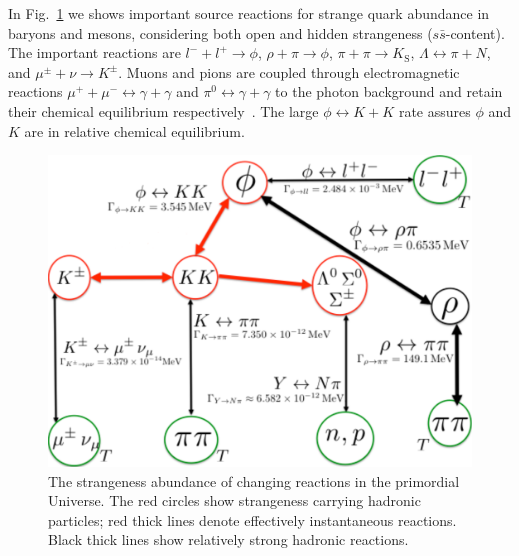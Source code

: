 \documentclass[universe,article,submit,moreauthors,pdftex,a4paper]{Definitions/mdpi}
\begin{document}
In Fig.~\ref{Strangeness_map2} we shows important source reactions for  strange quark abundance in baryons and mesons, considering both open and hidden strangeness ($s\bar s$-content). The important reactions are $l^-+l^+\rightarrow\phi$, $\rho+\pi\rightarrow\phi$, $\pi+\pi\rightarrow K_\mathrm{S}$, $\Lambda \leftrightarrow \pi+ N$, and $\mu^\pm+\nu\rightarrow K^\pm$. Muons and pions are coupled through electromagnetic reactions $\mu^++\mu^-\leftrightarrow\gamma+\gamma$ and $\pi^0\leftrightarrow\gamma+\gamma$ to the photon background and retain their chemical equilibrium respectively~\cite{Rafelski:2021aey,Kuznetsova:2008jt}. The large $\phi\leftrightarrow K+K$ rate assures $\phi$ and $K$ are in relative chemical equilibrium. 
\begin{figure} %
\centering
\includegraphics[width=0.8\linewidth]{./plots/Strangeness002_new.pdf}
\caption{
The strangeness abundance of changing reactions in the primordial Universe. The red circles show strangeness carrying hadronic particles; red thick lines denote effectively instantaneous reactions. Black thick lines show relatively strong hadronic reactions.}
\label{Strangeness_map2}
\end{figure}
\end{document}
